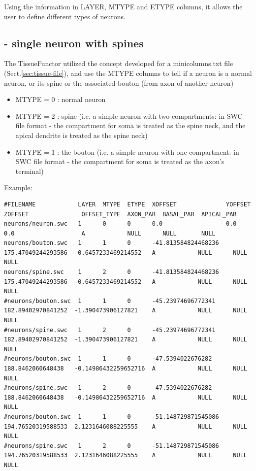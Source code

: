 Using the information in LAYER, MTYPE and ETYPE columns, it allows the user to
define different types of neurons.


\subsection{ - single neuron with spines}
\label{sec:tissue-file-neuron-with-spines}

The TissueFunctor utilized the concept developed for a 
minicolumns.txt file  (Sect.\ref{sec:tissue-file}), and use the MTYPE columns to
tell if a neuron is a normal neuron, or its spine or the associated bouton
(from axon of another neuron)
\begin{itemize}
  \item MTYPE = 0 : normal neuron
  \item MTYPE = 2 : spine (i.e. a simple neuron with two compartments: in SWC
  file format - the compartment for soma is treated as the spine neck, and the
  apical dendrite is treated as the spine neck)
  \item MTYPE = 1 : the bouton (i.e. a simple neuron with one compartment: in
  SWC file format - the compartment for soma is treated as the axon's terminal)
\end{itemize}

Example:
{\tiny
\begin{Verbatim}
#FILENAME            LAYER  MTYPE  ETYPE  XOFFSET              YOFFSET             ZOFFSET               OFFSET_TYPE  AXON_PAR  BASAL_PAR  APICAL_PAR
neurons/neuron.swc   1      0      0      0.0                  0.0                 0.0                   A            NULL      NULL       NULL
neurons/bouton.swc   1      1      0      -41.813584824468236  175.47049244293586  -0.6457233469214552   A            NULL      NULL       NULL
neurons/spine.swc    1      2      0      -41.813584824468236  175.47049244293586  -0.6457233469214552   A            NULL      NULL       NULL
#neurons/bouton.swc  1      1      0      -45.23974696772341   182.89402970841252  -1.390473906127821    A            NULL      NULL       NULL
#neurons/spine.swc   1      2      0      -45.23974696772341   182.89402970841252  -1.390473906127821    A            NULL      NULL       NULL
#neurons/bouton.swc  1      1      0      -47.5394022676282    188.8462060648438   -0.14986432259652716  A            NULL      NULL       NULL
#neurons/spine.swc   1      2      0      -47.5394022676282    188.8462060648438   -0.14986432259652716  A            NULL      NULL       NULL
#neurons/bouton.swc  1      1      0      -51.148729871545086  194.76520319588533  2.1231646088225555    A            NULL      NULL       NULL
#neurons/spine.swc   1      2      0      -51.148729871545086  194.76520319588533  2.1231646088225555    A            NULL      NULL       NULL
\end{Verbatim}
}

